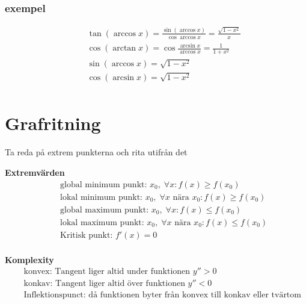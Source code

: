 \documentclass{article}
\begin{document}
\subsubsection{exempel}
\begin{align*}
  &\quad  \tan{(\arccos{x})} = \frac{\sin{(\arccos{x})}}{\cos{\arccos{x}}}= \frac{\sqrt{1-x^2}}{x} \\
  &\quad  \cos{(\arctan{x})} = \cos{\frac{\arcsin{x}}{\arccos{x}}}= \frac{1}{1+x^2} \\ %
  &\quad  \sin{(\arccos{x})} = \sqrt{1-x^2} \\
  &\quad  \cos{(\arcsin{x})} = \sqrt{1-x^2} \\
\end{align*}



\section{Grafritning}
Ta reda på extrem punkterna och rita utifrån det

\textbf{Extremvärden}
\begin{align*}
  &\quad  \text{global minimum punkt: } x_0, \; \forall x: f(x) \geq f(x_0) \\
  &\quad  \text{lokal minimum punkt: } x_0, \; \forall x \text{ nära } x_0: f(x) \geq f(x_0) \\
  &\quad  \text{global maximum punkt: } x_0, \; \forall x: f(x) \leq f(x_0) \\
  &\quad  \text{lokal maximum punkt: } x_0, \; \forall x \text{ nära } x_0: f(x) \leq f(x_0) \\
  &\quad  \text{Kritisk punkt: } f'(x)=0 \\
\end{align*}


\textbf{Komplexity}
\begin{align*}
  &\quad  \text{konvex: Tangent liger altid under funktionen } y''>0 \\
  &\quad  \text{konkav: Tangent liger altid över funktionen } y''<0 \\
  &\quad  \text{Inflektionspunct: då funktionen byter från konvex till konkav eller tvärtom }  \\
\end{align*}
\end{document}
